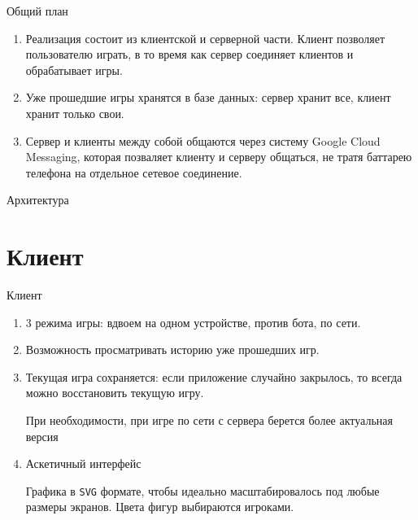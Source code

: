 \documentclass{beamer}
\def\t{\texttt}
\newcommand{\cimg}[2]{%
    \begin{center}%
        \ifthenelse{\equal{#2}{}}{%
            \texttt{[image: \#1]}
        }{%
            \texttt{[image: \#1]}
        }%
    \end{center}%
}
\begin{document}
\begin{frame}[t]{Общий план}
    \begin{enumerate}
    \item
        Реализация состоит из клиентской и серверной части.
        Клиент позволяет пользователю играть, в то время как сервер соединяет клиентов и обрабатывает игры.
    \pause

    \item
        Уже прошедшие игры хранятся в базе данных: сервер хранит все, клиент хранит только свои.
    \pause
    
    \item
        Сервер и клиенты между собой общаются через систему Google Cloud Messaging, которая позваляет клиенту и серверу общаться, не тратя баттарею телефона на отдельное сетевое соединение.
    \end{enumerate}
\end{frame}
\begin{frame}[t]{Архитектура}
	\cimg{04.png}{0.7}
\end{frame}
\section{Клиент}

\begin{frame}[t]{Клиент}
    \begin{enumerate}
    \item
        3 режима игры: вдвоем на одном устройстве, против бота, по сети.
    \pause
    \item
        Возможность просматривать историю уже прошедших игр.
    \pause
    \item
        Текущая игра сохраняется: если приложение случайно закрылось, то всегда можно восстановить текущую игру.

        При необходимости, при игре по сети с сервера берется более актуальная версия
    \pause
    \item
        Аскетичный интерфейс

        Графика в \t{SVG} формате, чтобы идеально масштабировалось под любые размеры экранов.
		Цвета фигур выбираются игроками.
    \end{enumerate}
\end{frame}
\end{document}
